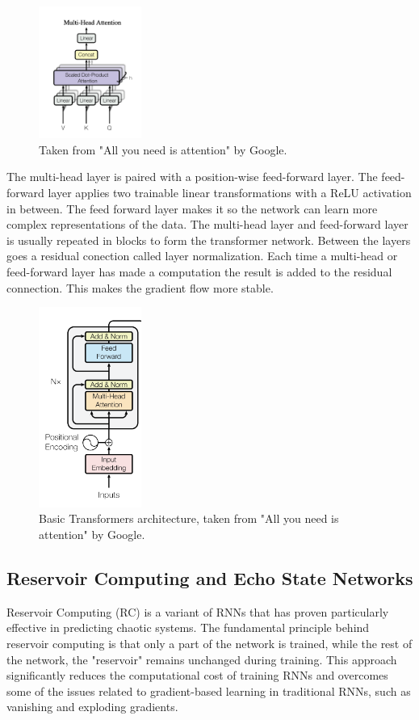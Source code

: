 \documentclass[11pt]{article}
\begin{document}
\begin{figure}[h]
\centering
\includegraphics[width=0.3\textwidth]{multi-head.png}
\caption{Taken from "All you need is attention" by Google. }
\end{figure}

The multi-head layer is paired with a position-wise feed-forward layer. The feed-forward layer applies two trainable linear transformations with a ReLU activation in between. The feed forward layer makes it so the network can learn more complex representations of the data. The multi-head layer and feed-forward layer is usually repeated in blocks to form the transformer network. Between the layers goes a residual conection called layer normalization. Each time a multi-head or feed-forward layer has made a computation the result is added to the residual connection. This makes the gradient flow more stable.

\begin{figure}[h]
\centering
\includegraphics[width=0.3\textwidth]{transformer-basic.png}
\caption{Basic Transformers architecture, taken from "All you need is attention" by Google. }
\end{figure}

\subsection{Reservoir Computing and Echo State Networks}
Reservoir Computing (RC) is a variant of RNNs that has proven particularly effective in predicting chaotic systems. The fundamental principle behind reservoir computing is that only a part of the network is trained, while the rest of the network, the "reservoir" remains unchanged during training. This approach significantly reduces the computational cost of training RNNs and overcomes some of the issues related to gradient-based learning in traditional RNNs, such as vanishing and exploding gradients.
\end{document}

